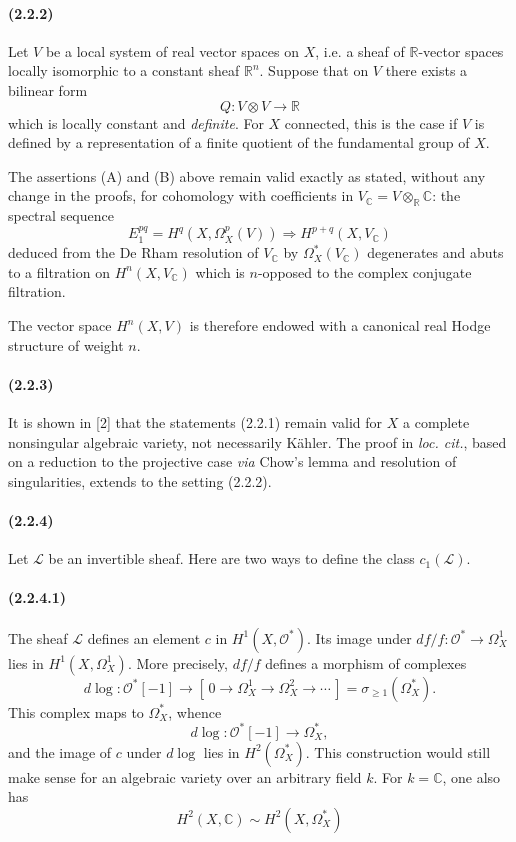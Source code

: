 \documentclass[10pt]{article}
\newcommand{\C}{\mathbb C}
\newcommand{\R}{\mathbb R}
\providecommand{\cO}{\mathcal O}
\providecommand{\cL}{\mathcal L}
\providecommand{\cO}{\mathcal O}
\providecommand{\cL}{\mathcal L}
\newcommand{\dlog}{d\log}
\begin{document}
\paragraph{(2.2.2)} Let $V$ be a local system of real vector spaces on $X$, i.e. a sheaf of $\R$-vector spaces locally isomorphic to a constant sheaf $\R^n$. Suppose that on $V$ there exists a bilinear form
\[
Q:V\otimes V\longrightarrow\R
\]
which is locally constant and \emph{definite}. For $X$ connected, this is the case if $V$ is defined by a representation of a finite quotient of the fundamental group of $X$.

The assertions (A) and (B) above remain valid exactly as stated, without any change in the proofs, for cohomology with coefficients in $V_\C=V\otimes_\R\C$: the spectral sequence
\[
E_1^{pq}=H^q(X,\Omega_X^p(V))\Rightarrow H^{p+q}(X,V_\C)
\]
deduced from the De Rham resolution of $V_\C$ by $\Omega_X^*(V_\C)$ degenerates and abuts to a filtration on $H^n(X,V_\C)$ which is $n$-opposed to the complex conjugate filtration.

The vector space $H^n(X,V)$ is therefore endowed with a canonical real Hodge structure of weight $n$.

\paragraph{(2.2.3)} It is shown in [2] that the statements (2.2.1) remain valid for $X$ a complete nonsingular algebraic variety, not necessarily Kähler. The proof in \emph{loc. cit.}, based on a reduction to the projective case \emph{via} Chow's lemma and resolution of singularities, extends to the setting (2.2.2).

\paragraph{(2.2.4)} Let $\cL$ be an invertible sheaf. Here are two ways to define the class $c_1(\cL)$.

\paragraph{(2.2.4.1)} The sheaf $\cL$ defines an element $c$ in $H^1(X,\cO^*)$. Its image under $df/f:\cO^*\to\Omega_X^1$ lies in $H^1(X,\Omega_X^1)$. More precisely, $df/f$ defines a morphism of complexes
\[
\dlog:\cO^*[-1]\longrightarrow [\,0\to\Omega_X^1\to\Omega_X^2\to\cdots\,]=\sigma_{\ge1}(\Omega_X^*).
\]
This complex maps to $\Omega_X^*$, whence
\[
\dlog:\cO^*[-1]\longrightarrow\Omega_X^*,
\]
and the image of $c$ under $\dlog$ lies in $H^2(\Omega_X^*)$. This construction would still make sense for an algebraic variety over an arbitrary field $k$. For $k=\C$, one also has
\[
H^2(X,\C)\sim H^2(X,\Omega_X^*)
\]
\noindent\makebox[\textwidth][s]{and hence a class\hfill$c_1'(\cL)\in H^2(X,\C).$\hfill\phantom{and hence a class}}
\end{document}
